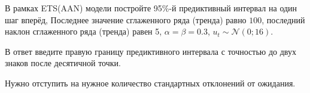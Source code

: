 
\begin{question}
В рамках ETS(AAN) модели постройте 95\%-й предиктивный интервал на один шаг вперёд,
Последнее значение сглаженного ряда (тренда) равно \(100\),
последний наклон сглаженного ряда (тренда) равен 5, \(\alpha = \beta = 0.3\),
\(u_t \sim \mathcal{N}(0; 16)\).

В ответ введите правую границу предиктивного интервала с точностью до двух знаков после десятичной точки.
\end{question}

\begin{solution}
Нужно отступить на нужное количество стандартных отклонений от ожидания.
\end{solution}

